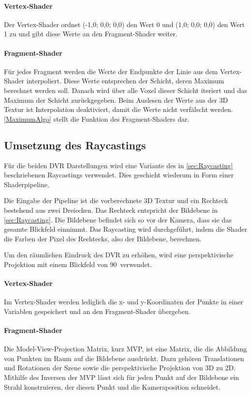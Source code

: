 \documentclass[a4paper,fontsize=12pt,toc=bib,parskip=half,ngerman]{scrartcl}
\begin{document}
\paragraph{Vertex-Shader}
Der Vertex-Shader ordnet (-1,0; 0,0; 0,0) den Wert 0 und (1,0; 0,0; 0,0) den Wert 1 zu und gibt diese Werte an den Fragment-Shader weiter.

\paragraph{Fragment-Shader}
F\"ur jedes Fragment werden die Werte der Endpunkte der Linie aus dem Vertex-Shader interpoliert. Diese Werte entsprechen der Schicht, deren Maximum berechnet werden soll. Danach wird \"uber alle Voxel dieser Schicht iteriert und das Maximum der Schicht zur\"uckgegeben. Beim Auslesen der Werte aus der 3D Textur ist Interpolation deaktiviert, damit die Werte nicht verf\"alscht werden. \cref{MaximumAlgo} stellt die Funktion des Fragment-Shaders dar.

\subsection{Umsetzung des Raycastings}
\label{RaycastingImplementation}

F\"ur die beiden DVR Darstellungen wird eine Variante des in \cref{sec:Raycasting} beschriebenen Raycastings verwendet. Dies geschieht wiederum in Form einer Shaderpipeline.

Die Eingabe der Pipeline ist die vorberechnete 3D Textur und ein Rechteck bestehend aus zwei Dreiecken. Das Rechteck entspricht der Bildebene in \cref{sec:Raycasting}. Die Bildebene befindet sich so vor der Kamera, dass sie das gesamte Blickfeld einnimmt. Das Raycasting wird durchgef\"uhrt, indem die Shader die Farben der Pixel des Rechtecks, also der Bildebene, berechnen.

Um den r\"aumlichen Eindruck des DVR zu erh\"ohen, wird eine perspektivische Projektion mit einem Blickfeld von 90\textdegree~verwendet.

\paragraph{Vertex-Shader}
Im Vertex-Shader werden lediglich die x- und y-Koordinaten der Punkte in einer Variablen gespeichert und an den Fragment-Shader \"ubergeben.

\paragraph{Fragment-Shader}
Die \glq Model-View-Projection Matrix\grq{}, kurz MVP, ist eine Matrix, die die Abbildung von Punkten im Raum auf die Bildebene ausdr\"uckt. Dazu geh\"oren Translationen und Rotationen der Szene sowie die perspektivische Projektion von 3D zu 2D. Mithilfe des Inversen der MVP l\"asst sich f\"ur jeden Punkt auf der Bildebene ein Strahl konstruieren, der diesen Punkt und die Kameraposition schneidet. 
\end{document}
